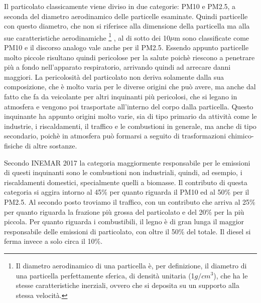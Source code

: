 \documentclass[a4paper]{report}
\begin{document}
Il particolato classicamente viene diviso in due categorie: PM10 e PM2.5, a seconda del diametro aerodinamico delle particelle esaminate. Quindi particelle con questo diametro, che non si riferisce alla dimensione della particella ma alla sue caratteristiche aerodinamiche
\footnote{Il diametro aerodinamico di una particella è, per definizione, il diametro di una particella perfettamente sferica, di densità unitaria (1$g/cm^3$), che ha le stesse caratteristiche inerziali, ovvero che si deposita su un supporto alla stessa velocità.}
, al di sotto dei 10$\mu$m sono classificate come PM10 e il discorso analogo vale anche per il PM2.5. Essendo appunto particelle molto piccole risultano quindi pericolose per la salute poichè riescono a penetrare più a fondo nell'apparato respiratorio, arrivando quindi ad arrecare danni maggiori. La pericolosità del particolato non deriva solamente dalla sua composizione, che è molto varia per le diverse origini che può avere, ma anche dal fatto che fa da veicolante per altri inquinanti più pericolosi, che si legano in atmosfera e vengono poi trasportate all'interno del corpo dalla particella. Questo inquinante ha appunto origini molto varie, sia di tipo primario da attività come le industrie, i riscaldamenti, il traffico e le combustioni in generale, ma anche di tipo secondario, poichè in atmosfera può formarsi a seguito di trasformazioni chimico-fisiche di altre sostanze.

Secondo INEMAR 2017 \cite{inemar2017}
 la categoria maggiormente responsabile per le emissioni di questi inquinanti sono le combustioni non industriali, quindi, ad esempio, i riscaldamenti domestici, specialmente quelli a biomasse. Il contributo di questa categoria si aggira intorno al 45\% per quanto riguarda il PM10 ed al 50\% per il PM2.5. Al secondo posto troviamo il traffico, con un contributo che arriva al 25\% per quanto riguarda la frazione più grossa del particolato e del 20\% per la più piccola. Per quanto riguarda i combustibili, il legno è di gran lunga il maggior responsabile delle emissioni di particolato, con oltre il 50\% del totale. Il diesel si ferma invece a solo circa il 10\%.
\end{document}
